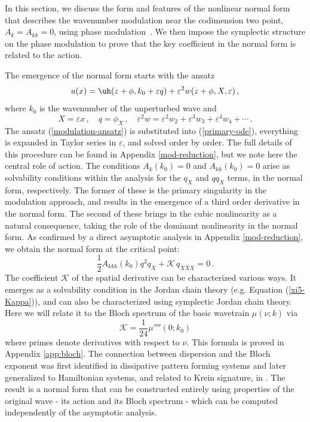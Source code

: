 \documentclass[10pt]{article}
\def\eps{{\varepsilon}} \def\reps{\textcolor{red}{{\varepsilon}}}
\begin{document}
In this section, we discuss the form and features of the nonlinear normal form
that describes the wavenumber modulation near the codimension two point, $A_k=A_{kk}=0$, using phase modulation~\cite{Hoyle2006}. We then impose the symplectic structure on the phase modulation to prove that the key coefficient in the normal form is related to the action.

The emergence of the normal form starts with the ansatz  
%
\begin{equation}\label{modulation-ansatz}
u(x) = \uh(z+\phi,k_0+\eps q) + \eps^2 w(z+\phi,X,\eps)\,,
\end{equation}
%
where $k_0$ is the wavenumber of the unperturbed wave and
%
\begin{equation}\label{q-def}
X=\eps x\,,\quad q=\phi_X\,,\quad \eps^2w = \eps^2w_2 + \eps^3 w_3 +
\eps^4 w_4 + \cdots\,.
\end{equation}
%
The ansatz (\ref{modulation-ansatz}) is substituted into (\ref{primary-ode}),
everything is expanded in Taylor series in $\eps$, and solved order by order.
The full details of this procedure can be found in Appendix \ref{mod-reduction},
but we note here the central role of action.  The conditions $A_k(k_0) = 0$ and $A_{kk}(k_0) = 0$ arise as
solvability conditions within the analysis for the $q_X$ and $qq_X$ terms, in the normal form,
respectively. The former of these is the primary singularity in the
modulation approach, and results in the emergence of a third order derivative in the normal form.
The second of these brings in the cubic nonlinearity as a natural
consequence, taking the role of the dominant nonlinearity in the normal
form. As confirmed by a direct asymptotic analysis in Appendix \ref{mod-reduction}, we obtain the normal form at the critical point:
%
\begin{equation}\label{nf-1}
  \frac{1}{2}A_{kkk}(k_0) q^2q_X + \mathscr{K} \,q_{XXX}= 0 \,.
\end{equation}
%
The coefficient $\mathscr{K}$ of the spatial derivative can be characterized various ways.  It emerges as a solvability condition in the Jordan chain theory (e.g. Equation (\ref{xi5-Kappa})), and can also be characterized using symplectic Jordan chain theory.  Here we will relate it to the Bloch spectrum of the basic wavetrain $\mu(\nu;k)$ via
%
\begin{equation}\label{mu-bloch}
\mathscr{K} = \frac{1}{24} \mu''''(0;k_0)
\end{equation}
%
where primes denote derivatives with respect to $\nu$. This formula is proved in Appendix \ref{app:bloch}. The connection between dispersion and the Bloch exponent was first
identified in dissipative pattern forming systems \cite{doelman2009dynamics} and later
generalized to Hamiltonian systems, and related to Krein signature, in \cite{ratliff2021}. The result is a normal
form that can be constructed entirely using properties of the original wave -
its action and its Bloch spectrum - which can be computed independently of the
asymptotic analysis.
\end{document}
